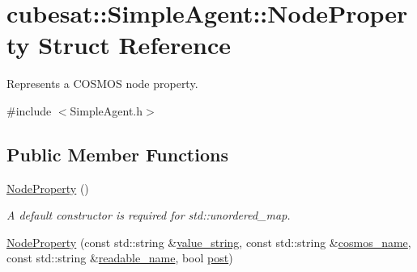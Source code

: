 \hypertarget{structcubesat_1_1SimpleAgent_1_1NodeProperty}{}\section{cubesat\+:\+:Simple\+Agent\+:\+:Node\+Property Struct Reference}
\label{structcubesat_1_1SimpleAgent_1_1NodeProperty}


Represents a C\+O\+S\+M\+OS node property.  




{\ttfamily \#include $<$Simple\+Agent.\+h$>$}

\subsection*{Public Member Functions}
\begin{DoxyCompactItemize}
\item 
\hyperlink{structcubesat_1_1SimpleAgent_1_1NodeProperty_a381db507c0ff0f09dd6ad5f4b93743a8}{Node\+Property} ()
\begin{DoxyCompactList}\small\item\em A default constructor is required for std\+::unordered\+\_\+map. \end{DoxyCompactList}\item 
\hyperlink{structcubesat_1_1SimpleAgent_1_1NodeProperty_aa79f92a0bebd44ca9339780dd682d69d}{Node\+Property} (const std\+::string \&\hyperlink{structcubesat_1_1SimpleAgent_1_1NodeProperty_aede92ae1ce895354a2cd9995cd7a8d6f}{value\+\_\+string}, const std\+::string \&\hyperlink{structcubesat_1_1SimpleAgent_1_1NodeProperty_a6d3e8b9ad7ceba4dadbb90c036c3bd15}{cosmos\+\_\+name}, const std\+::string \&\hyperlink{structcubesat_1_1SimpleAgent_1_1NodeProperty_a7251c568d143b84af02872dcc812b29c}{readable\+\_\+name}, bool \hyperlink{structcubesat_1_1SimpleAgent_1_1NodeProperty_a4e346ca338dcf56d731b5455895afa39}{post})
\end{DoxyCompactItemize}
